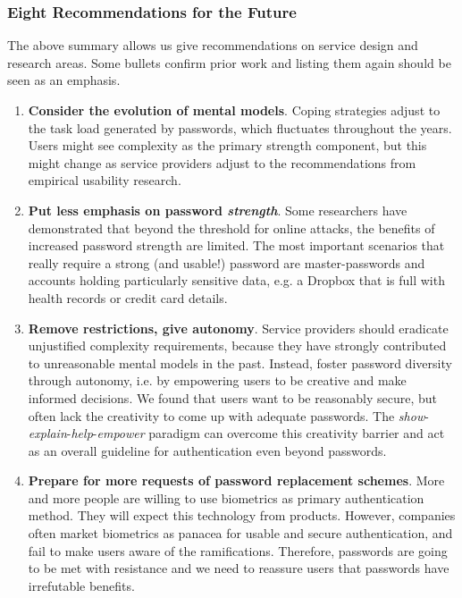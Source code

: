 \subsubsection{Eight Recommendations for the Future}\label{sec:summary:recommendations}
The above summary allows us give recommendations on service design and research areas. Some bullets confirm prior work and listing them again should be seen as an emphasis. 
\begin{enumerate}
	\item \textbf{Consider the evolution of mental models}. Coping strategies adjust to the task load generated by passwords, which fluctuates throughout the years. Users might see complexity as the primary strength component, but this might change as service providers adjust to the recommendations from empirical usability research. 
	
	\item \textbf{Put less emphasis on password \textit{strength}}. Some researchers have demonstrated that beyond the threshold for online attacks, the benefits of increased password strength are limited. The most important scenarios that really require a strong (and usable!) password are master-passwords and accounts holding particularly sensitive data, e.g. a Dropbox that is full with health records or credit card details. 
	
	\item \textbf{Remove restrictions, give autonomy}. Service providers should eradicate unjustified complexity requirements, because they have strongly contributed to unreasonable mental models in the past. Instead, foster password diversity through autonomy, i.e. by empowering users to be creative and make informed decisions. We found that users want to be reasonably secure, but often lack the creativity to come up with adequate passwords.
	The \textit{show}-\textit{explain}-\textit{help}-\textit{empower} paradigm can overcome this creativity barrier and act as an overall guideline for authentication even beyond passwords.
	
	\item \textbf{Prepare for more requests of password replacement schemes}. More and more people are willing to use biometrics as primary authentication method. They will expect this technology from products. However, companies often market biometrics as panacea for usable and secure authentication, and fail to make users aware of the ramifications. Therefore, passwords are going to be met with resistance and we need to reassure users that passwords have irrefutable benefits. 
		

\end{enumerate}
